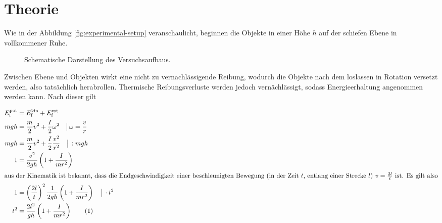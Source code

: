 \section{Theorie}
\label{sec:Theorie}



Wie in der Abbildung \autoref{fig:experimental-setup} veranschaulicht, beginnen die Objekte 
in einer Höhe $h$ auf der schiefen Ebene in vollkommener Ruhe.


\begin{figure}
  \centering
  \caption{Schematische Darstellung des Versuchsaufbaus.}
  \label{fig:experimental-setup}
\end{figure}



Zwischen Ebene und Objekten wirkt eine nicht zu vernachlässigende Reibung, wodurch die 
Objekte nach dem loslassen in Rotation versetzt werden, also tatsächlich herabrollen.
Thermische Reibungsverluste werden jedoch vernächlässigt, sodass Energieerhaltung
angenommen werden kann. Nach dieser gilt

\begin{align*}
E^\text{pot}_\text{i}  &= E^\text{kin}_\text{f} +  E^\text{rot}_\text{f} \\
mgh &= \frac{m}{2}v^2 + \frac{I}{2}\omega^2 \quad\big|\,\omega = \frac{v}{r} \\
mgh &= \frac{m}{2}v^2 + \frac{I}{2}\frac{v^2}{r^2}\quad\big|\, :mgh \\
1 &= \frac{v^2}{2gh} \left(1 + \frac{I}{mr^2} \right)\\
\intertext{aus der Kinematik ist bekannt, dass die Endgeschwindigkeit einer
beschleunigten Bewegung (in der Zeit $t$, entlang einer Strecke $l$) $v = \frac{2l}{t}$ ist.
Es gilt also}
1 &= \left(\frac{2l}{t}\right)^2 \frac{1}{2gh} \left(1 + \frac{I}{mr^2} \right)\quad\big|\, \cdot t^2 \\
\addtocounter{equation}{1}
t^2 &= \frac{2l^2}{gh} \left(1 + \frac{I}{mr^2} \right)\label{eq:tsquared}\tag{\theequation}
\end{align*}


